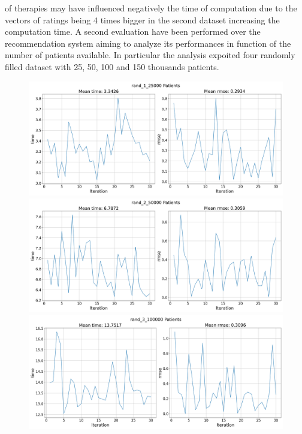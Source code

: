 of therapies may have influenced negatively the time of computation due to
the vectors of ratings being 4 times bigger in the second dataset
increasing the computation time.
A second evaluation have been performed over the recommendation system aiming
to analyze its performances in function of the number of patients available.
In particular the analysis expoited four randomly filled dataset with 25, 50,
100 and 150 thousands patients.
\begin{figure}[h]
		\includegraphics[width=\columnwidth]{../results/Stats/rand_1_25000_patients_rmse_and_time.png} \\
		\includegraphics[width=\columnwidth]{../results/Stats/rand_2_50000_patients_rmse_and_time.png} \\
		\includegraphics[width=\columnwidth]{../results/Stats/rand_3_100000_patients_rmse_and_time.png} \\

\end{figure}
